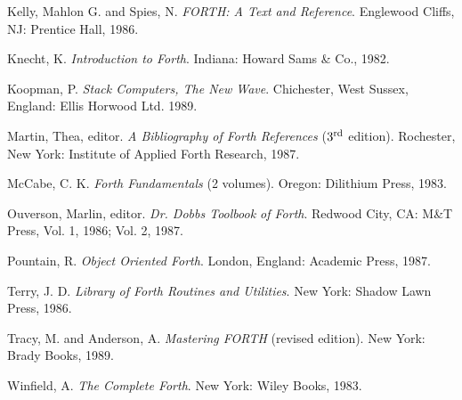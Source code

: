 \begin{description}
\begin{description}
	\item Kelly, Mahlon G. and Spies, N.
		\emph{FORTH: A Text and Reference}.
		Englewood Cliffs, NJ: Prentice Hall, 1986.

	\item Knecht, K.
		\emph{Introduction to Forth}.
		Indiana: Howard Sams \& Co., 1982.

	\item Koopman, P.
		\emph{Stack Computers, The New Wave}.
		Chichester, West Sussex, England: Ellis Horwood Ltd. 1989.

	\item Martin, Thea, editor.
		\emph{A Bibliography of Forth References} ($3^{\textrm{\scriptsize rd}}$ edition).
		Rochester, New York: Institute of Applied Forth Research, 1987.

	\item McCabe, C. K.
		\emph{Forth Fundamentals} (2 volumes).
		Oregon: Dilithium Press, 1983.

	\item Ouverson, Marlin, editor.
		\emph{Dr. Dobbs Toolbook of Forth}.
		Redwood City, CA: M\&T Press, Vol. 1, 1986; Vol. 2, 1987.

	\item {}

	\item Pountain, R.
		\emph{Object Oriented Forth}.
		London, England: Academic Press, 1987.

	\item {}

	\item {}

	\item Terry, J. D.
		\emph{Library of Forth Routines and Utilities}.
		New York: Shadow Lawn Press, 1986.

	\item Tracy, M. and Anderson, A.
		\emph{Mastering FORTH} (revised edition).
		New York: Brady Books, 1989.

	\item Winfield, A.
		\emph{The Complete Forth}.
		New York: Wiley Books, 1983.
	\end{description}



\end{description}
